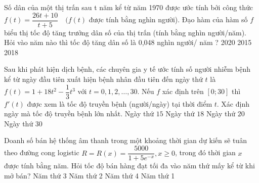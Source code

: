 \begin{ex}
	Số dân của một thị trấn sau t năm kể từ năm 1970 được ước tính bởi công thức $f(t)=\dfrac{26 t+10}{t+5}\quad (f(t)$ được tính bằng nghìn người). Đạo hàm của hàm số $f$ biểu thị tốc độ tăng trưởng dân số của thị trấn (tính bằng nghìn người/năm). Hỏi vào năm nào thì tốc độ tăng dân số là 0,048 nghìn người/ năm ?
	\choice
	{}
	{2020}
	{2015}
	{2018}
	\loigiai{
		
	}
\end{ex}
\begin{ex}%
	Sau khi phát hiện dịch bệnh, các chuyên gia y tế ước tính số người nhiễm bệnh kể từ ngày đầu tiên xuất hiện bệnh nhân đầu tiên đến ngày thứ $t$ là $f(t)=1+18t^2-\dfrac{1}{3}t^3$ với $t=0,1,2, \ldots, 30$. Nếu $f$ xác định trên $[0;30]$ thì $f'(t)$ được xem là tốc độ truyền bệnh (người/ngày) tại thời điểm $t$. Xác định ngày mà tốc độ truyền bệnh lớn nhất.
	\choice
	{Ngày thứ $15$}
	{\True Ngày thứ $18$}
	{Ngày thứ $20$}
	{Ngày thứ $30$}
\end{ex}
\begin{ex}
	Doanh số bán hệ thống âm thanh trong một khoảng thời gian dự kiến sẽ tuân theo đường cong logistic $R=R(x)=\dfrac{5000}{1+5 e^{-x}}, x \geq 0$, trong đó thời gian $x$ được tính bằng năm. Hỏi tốc độ bán hàng đạt tối đa vào năm thứ mấy kể từ khi mở bán?
	\choice
	{Năm thứ 3}
	{\True Năm thứ 2}
	{Năm thứ 4}
	{Năm thứ 1}
\end{ex}
